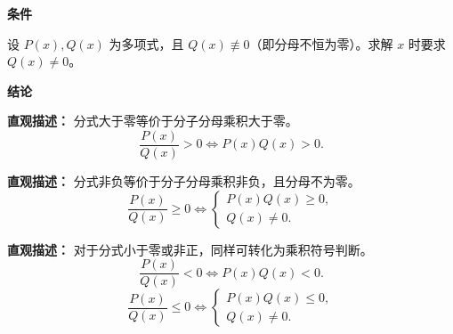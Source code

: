 \begin{statementbox}
	\textbf{\textcolor{CStatement}{条件}}
	\begin{description}[style=nextline, leftmargin=2.8em, labelsep=0.5em, itemsep=0.35em]
		\item[\textbf{\textcolor{CStatement}{条件 1（多项式非零）：}}]
			设 $P(x), Q(x)$ 为多项式，且 $Q(x) \not\equiv 0$（即分母不恒为零）。求解 $x$ 时要求 $Q(x) \neq 0$。
	\end{description}
	\textbf{\textcolor{CStatement}{结论}}
	\begin{description}[style=nextline, leftmargin=2.8em, labelsep=0.5em, itemsep=0.45em]
		\item[\textbf{\textcolor{CStatement}{结论一（大于0转化）：}}]
			\textbf{\textcolor{CStatement}{直观描述：}}
			分式大于零等价于分子分母乘积大于零。
			\[
				\frac{P(x)}{Q(x)} > 0 \iff P(x)Q(x) > 0.
			\]
		\item[\textbf{\textcolor{CStatement}{结论二（非负转化）：}}]
			\textbf{\textcolor{CStatement}{直观描述：}}
			分式非负等价于分子分母乘积非负，且分母不为零。
			\[
				\frac{P(x)}{Q(x)} \ge 0 \iff
				\begin{cases}
					P(x)Q(x) \ge 0, \\ Q(x) \neq 0.
			\end{cases}
			\]
		\item[\textbf{\textcolor{CStatement}{推广结论（不等号推广）：}}]
			\textbf{\textcolor{CStatement}{直观描述：}}
			对于分式小于零或非正，同样可转化为乘积符号判断。
			\[
				\frac{P(x)}{Q(x)} < 0 \iff P(x)Q(x) < 0.
			\]
			\[
				\frac{P(x)}{Q(x)} \le 0 \iff
				\begin{cases}
					P(x)Q(x) \le 0, \\ Q(x) \neq 0.
			\end{cases}
			\]
	\end{description}

\end{statementbox}
